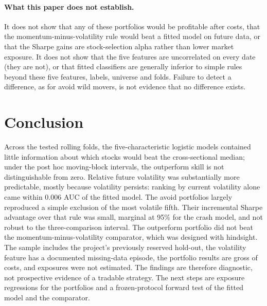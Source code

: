 \documentclass[11pt]{article}
\begin{document}
\paragraph{What this paper does not establish.} It does not show that any of these portfolios would be profitable after costs, that the momentum-minus-volatility rule would beat a fitted model on future data, or that the Sharpe gains are stock-selection alpha rather than lower market exposure. It does not show that the five features are uncorrelated on every date (they are not), or that fitted classifiers are generally inferior to simple rules beyond these five features, labels, universe and folds. Failure to detect a difference, as for avoid wild movers, is not evidence that no difference exists.

\section{Conclusion}
Across the tested rolling folds, the five-characteristic logistic models contained little information about which stocks would beat the cross-sectional median; under the post hoc moving-block intervals, the outperform skill is not distinguishable from zero. Relative future volatility was substantially more predictable, mostly because volatility persists: ranking by current volatility alone came within 0.006 AUC of the fitted model. The avoid portfolios largely reproduced a simple exclusion of the most volatile fifth. Their incremental Sharpe advantage over that rule was small, marginal at 95\% for the crash model, and not robust to the three-comparison interval. The outperform portfolio did not beat the momentum-minus-volatility comparator, which was designed with hindsight. The sample includes the project's previously reserved hold-out, the volatility feature has a documented missing-data episode, the portfolio results are gross of costs, and exposures were not estimated. The findings are therefore diagnostic, not prospective evidence of a tradable strategy. The next steps are exposure regressions for the portfolios and a frozen-protocol forward test of the fitted model and the comparator.
\end{document}

